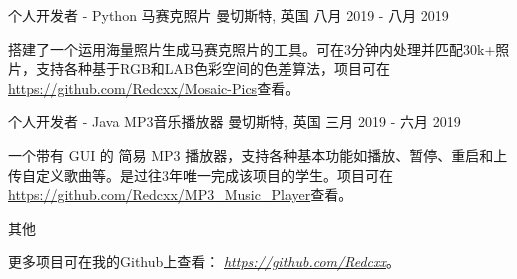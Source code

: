 \begin{cventries}
  \cventry
    {个人开发者 - Python} %
    {马赛克照片} %
    {曼切斯特, 英国} %
    {八月 2019 - 八月 2019} %
    {
      \begin{cvitems} %
        \item {搭建了一个运用海量照片生成马赛克照片的工具。可在3分钟内处理并匹配30k+照片，支持各种基于RGB和LAB色彩空间的色差算法，项目可在\href{https://github.com/Redcxx/Mosaic-Pics}{https://github.com/Redcxx/Mosaic-Pics}查看。}
      \end{cvitems}
    }

  \cventry
    {个人开发者 - Java} %
    {MP3音乐播放器} %
    {曼切斯特, 英国} %
    {三月 2019 - 六月 2019} %
    {
      \begin{cvitems} %
        \item {一个带有 GUI 的 简易 MP3 播放器，支持各种基本功能如播放、暂停、重启和上传自定义歌曲等。是过往3年唯一完成该项目的学生。项目可在\href{https://github.com/Redcxx/MP3_Music_Player}{https://github.com/Redcxx/MP3\_Music\_Player}查看。}
      \end{cvitems}
    }
    

  

  \cventry
    {} %
    {其他} %
    {} %
    {} %
    {
      \begin{cvitems} %
        \item {更多项目可在我的Github上查看： \href{https://github.com/Redcxx}{\textit{https://github.com/Redcxx}}。}
      \end{cvitems}
    }
  
    


\end{cventries}
